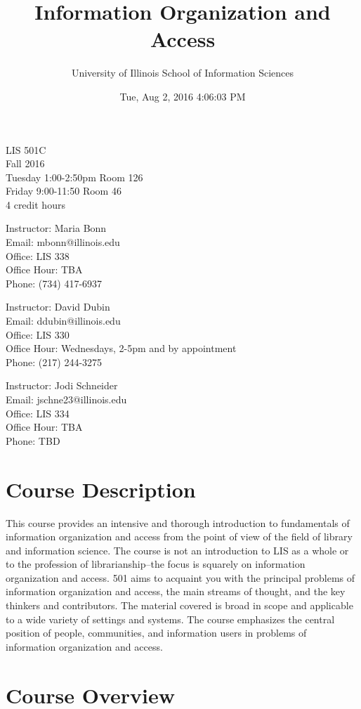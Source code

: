 \documentclass[]{article}
\title{Information Organization and Access}
\author{University of Illinois School of Information Sciences}
\date{Tue, Aug 2, 2016 4:06:03 PM}
\begin{document}
\maketitle

LIS 501C\\
Fall 2016\\
Tuesday 1:00-2:50pm Room 126\\
Friday 9:00-11:50 Room 46\\
4 credit hours

Instructor: Maria Bonn\\
Email: mbonn@illinois.edu\\
Office: LIS 338\\
Office Hour: TBA\\
Phone: (734) 417-6937

Instructor: David Dubin\\
Email: ddubin@illinois.edu\\
Office: LIS 330\\
Office Hour: Wednesdays, 2-5pm and by appointment\\
Phone: (217) 244-3275

Instructor: Jodi Schneider\\
Email: jschne23@illinois.edu\\
Office: LIS 334\\
Office Hour: TBA\\
Phone: TBD

\section{Course Description}\label{course-description}

This course provides an intensive and thorough introduction to
fundamentals of information organization and access from the point of
view of the field of library and information science. The course is not
an introduction to LIS as a whole or to the profession of
librarianship--the focus is squarely on information organization and
access. 501 aims to acquaint you with the principal problems of
information organization and access, the main streams of thought, and
the key thinkers and contributors. The material covered is broad in
scope and applicable to a wide variety of settings and systems. The
course emphasizes the central position of people, communities, and
information users in problems of information organization and access.

\section{Course Overview}\label{course-overview}
\end{document}
